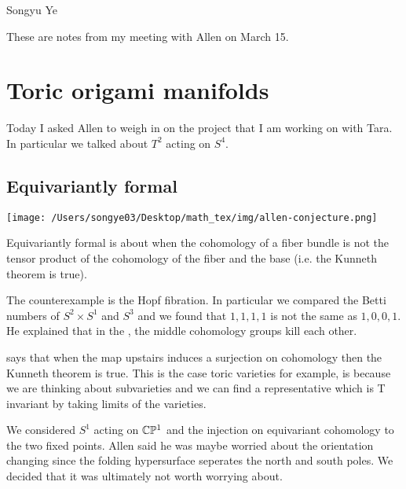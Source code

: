 \documentclass[12pt]{article}
\begin{document}
Songyu Ye

These are notes from my meeting with Allen on March 15.


\section{Toric origami manifolds}

Today I asked Allen to weigh in on the project that I am working on with Tara.
In particular we talked about $T^2$ acting on $S^4$. 

\subsection{Equivariantly formal}

\begin{center}
    \texttt{[image: /Users/songye03/Desktop/math\_tex/img/allen-conjecture.png]}
\end{center}

Equivariantly formal is about when the cohomology of a fiber bundle is not the tensor product of the cohomology of the fiber and the base (i.e.
the Kunneth theorem is true).

\hfill 

The counterexample is the Hopf fibration. In particular we compared the Betti numbers of $S^2\times S^1$ and $S^3$ and
we found that $1,1,1,1$ is not the same as $1,0,0,1$. He explained that in the , the middle cohomology groups kill each other.

\hfill 

 says that when the map upstairs induces a surjection on cohomology then the Kunneth theorem is true. 
This is the case toric varieties for example, is because we are thinking about subvarieties
and we can find a representative which is T invariant by taking limits of the varieties.

\begin{example}
    We considered $S^1$ acting on $\mathbb{C}\mathbb{P}^1$ and the injection on equivariant cohomology to the two fixed points.
    Allen said he was maybe worried about the orientation changing since the folding
    hypersurface seperates the north and south poles. We decided that it was ultimately not worth worrying about.
\end{example}
\end{document}

